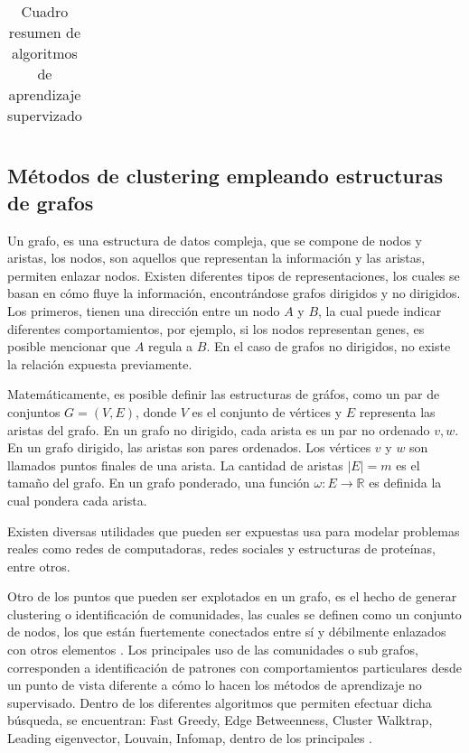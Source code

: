 \begin{table}[]
\begin{tabular}{|l|l|l|l|l|}
	\end{tabular}
	
	
	\caption{Cuadro resumen de algoritmos de aprendizaje supervizado}
	\label{cuadroResumen}
\end{table}

\subsection{Métodos de clustering empleando estructuras de grafos}

Un grafo, es una estructura de datos compleja, que se compone de nodos y aristas, los nodos, son aquellos que representan la información y las aristas, permiten enlazar nodos. Existen diferentes tipos de representaciones, los cuales se basan en cómo fluye la información, encontrándose grafos dirigidos y no dirigidos. Los primeros, tienen una dirección entre un nodo $A$ y $B$, la cual puede indicar diferentes comportamientos, por ejemplo, si los nodos representan genes, es posible mencionar que $A$ regula a $B$. En el caso de grafos no dirigidos, no existe la relación expuesta previamente.

Matemáticamente, es posible definir las estructuras de gráfos, como un par de conjuntos $G =(V,E)$, donde $V$ es el conjunto de vértices y  $E$ representa las aristas del grafo. En un grafo no dirigido, cada arista es un par no ordenado ${v,w}$. En un grafo dirigido, las aristas son pares ordenados. Los vértices $v$ y $w$ son llamados puntos finales de una arista. La cantidad de aristas $|E|=m$ es el tamaño del grafo. En un grafo ponderado, una función $\omega: E \rightarrow \mathbb{R}$ es definida la cual pondera cada arista.

Existen diversas utilidades que pueden ser expuestas usa para modelar problemas reales como redes de computadoras, redes sociales y estructuras de proteínas, entre otros. 

Otro de los puntos que pueden ser explotados en un grafo, es el hecho de generar clustering o identificación de comunidades, las cuales se definen como un conjunto de nodos, los que están fuertemente conectados entre sí y débilmente enlazados con otros elementos \cite{fortunato2012community}. Los principales uso de las comunidades o sub grafos, corresponden a identificación de patrones con comportamientos particulares desde un punto de vista diferente a cómo lo hacen los métodos de aprendizaje no supervisado. Dentro de los diferentes algoritmos que permiten efectuar dicha búsqueda, se encuentran: Fast Greedy, Edge Betweenness, Cluster Walktrap, Leading eigenvector, Louvain, Infomap, dentro de los principales \cite{newman2004detecting}.
 
